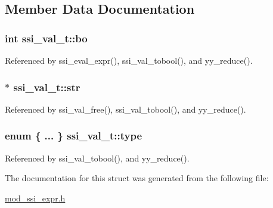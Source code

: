 \subsection{Member Data Documentation}
\hypertarget{structssi__val__t_a6352b924d470f6de74bf929c824224c7}{
\subsubsection[{bo}]{\setlength{\rightskip}{0pt plus 5cm}int ssi\-\_\-val\-\_\-t\-::bo}}\label{structssi__val__t_a6352b924d470f6de74bf929c824224c7}


Referenced by ssi\-\_\-eval\-\_\-expr(), ssi\-\_\-val\-\_\-tobool(), and yy\-\_\-reduce().

\hypertarget{structssi__val__t_acb17e14e911669ff1bdbdbfe8e118916}{
\subsubsection[{str}]{$\ast$ ssi\-\_\-val\-\_\-t\-::str}}\label{structssi__val__t_acb17e14e911669ff1bdbdbfe8e118916}


Referenced by ssi\-\_\-val\-\_\-free(), ssi\-\_\-val\-\_\-tobool(), and yy\-\_\-reduce().

\hypertarget{structssi__val__t_aa2681328d51ed332de8d1382e5061b39}{
\subsubsection[{type}]{\setlength{\rightskip}{0pt plus 5cm}enum \{ ... \}   ssi\-\_\-val\-\_\-t\-::type}}\label{structssi__val__t_aa2681328d51ed332de8d1382e5061b39}


Referenced by ssi\-\_\-val\-\_\-tobool(), and yy\-\_\-reduce().



The documentation for this struct was generated from the following file\-:\begin{DoxyCompactItemize}
\item 
\hyperlink{mod__ssi__expr_8h}{mod\-\_\-ssi\-\_\-expr.\-h}\end{DoxyCompactItemize}
